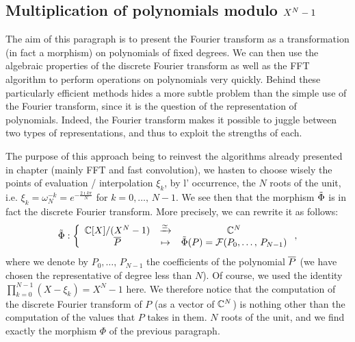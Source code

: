 \subsection{Multiplication of polynomials modulo $ X^N-1 $}
\label{sect2-multiplication-polynomials-modulo-xn-1} 
 
 
  The aim of this paragraph is to present the Fourier transform as a transformation (in fact a morphism) on polynomials of fixed degrees. We can then use the algebraic properties of the discrete Fourier transform as well as the FFT algorithm to perform operations on polynomials very quickly. Behind these particularly efficient methods hides a more subtle problem than the simple use of the Fourier transform, since it is the question of the representation of polynomials. Indeed, the Fourier transform makes it possible to juggle between two types of representations, and thus to exploit the strengths of each.
 
 
The purpose of this approach being to reinvest the algorithms already presented in chapter  (mainly FFT and fast convolution), we hasten to choose wisely the points of evaluation / interpolation $ \xi_k $, by l' occurrence, the $ N $ roots  of the unit, i.e. $ \xi_k = \omega_N^{- k} = e^{- \frac{2 \imath k \pi}{N}} $ for $ k = 0, \ldots, \, N-1 $. We see then that the morphism $ \tilde{\Phi} $ is in fact the discrete Fourier transform. More precisely, we can rewrite it as follows:
\begin{equation*}
\tilde{\Phi}: \left\{\begin{array}{ccc} \mathbb{C} [X] / (X^N-1) & \xrightarrow{\simeq} & \mathbb{C}^N \\\overline{P} & \mapsto & \tilde{\Phi} (P) = \mathcal{F}(P_0, \ldots, \, P_{N-1}) \end{array} \right.,
\end{equation*}
where we denote by $ P_0, \ldots, \, P_{N-1} $ the coefficients of the polynomial $ \overline{P} $ (we have chosen the representative of degree less than $ N $). Of course, we used the identity $ \prod_{k = 0}^{N-1}{(X- \xi_k)} = X^N-1 $ here. We therefore notice that the computation of the discrete Fourier transform of $ P $ (as a vector of $ \mathbb{C}^N $) is nothing other than the computation of the values that $ P $ takes in them. $ N $ roots  of the unit, and we find exactly the morphism $ \Phi $ of the previous paragraph.
 

